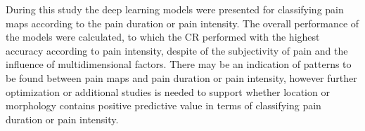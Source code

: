 During this study the deep learning models were presented for classifying pain maps according to the pain duration or pain intensity.
The overall performance of the models were calculated, to which the CR performed with the highest accuracy according to pain intensity, despite of the subjectivity of pain and the influence of multidimensional factors. 
There may be an indication of patterns to be found between pain maps and pain duration or pain intensity, however further optimization or additional studies is needed to support whether location or morphology contains positive predictive value in terms of classifying pain duration or pain intensity.
